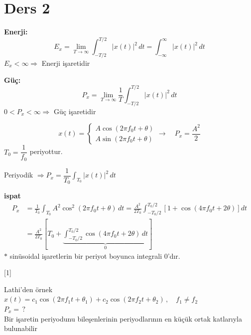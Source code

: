 \documentclass[11pt,a4paper]{article}
\begin{document}

\section{Ders 2}
\textbf{Enerji:}
\[ E_x = \lim_{T\to\infty}\int_{-T/2}^{T/2}|x(t)|^2\,dt = \int_{-\infty}^{\infty}|x(t)|^2\,dt \]
$E_x<\infty \Rightarrow$ Enerji işaretidir

\textbf{Güç:}
\[ P_x = \lim_{T\to\infty}\frac{1}{T}\int_{-T/2}^{T/2}|x(t)|^2\,dt \]
$0<P_x<\infty \Rightarrow$ Güç işaretidir

\[ x(t)=\begin{cases} A\cos(2\pi f_0 t+\theta)\\ A\sin(2\pi f_0 t+\theta)\end{cases} \longrightarrow\quad P_x=\frac{A^2}{2} \]
$T_0=\dfrac{1}{f_0}$ periyottur.

Periyodik $\Rightarrow P_x=\dfrac{1}{T_0}\displaystyle\int_{T_0}|x(t)|^2\,dt$

\textcolor{kirmizikalem}{\textbf{ispat}}
\begin{align*}
P_x &= \frac{1}{T_0}\int_{T_0}A^2\cos^2(2\pi f_0 t+\theta)\,dt = \frac{A^2}{2T_0}\int_{-T_0/2}^{T_0/2}\left[1+\cos(4\pi f_0 t+2\theta)\right]dt \\
&= \frac{A^2}{2T_0}\left[T_0+\underbrace{\int_{-T_0/2}^{T_0/2}\cos(4\pi f_0 t+2\theta)\,dt}_{0}\right]
\end{align*}
$\ast$ sinüsoidal işaretlerin bir periyot boyunca integrali 0'dır.

[1]

\begin{ornek}
  Lathi'den örnek \\
  $x(t)=c_1\cos(2\pi f_1 t+\theta_1)+c_2\cos(2\pi f_2 t+\theta_2)\,,\quad f_1\neq f_2$ \\
  $P_x=\,?$ \\
  Bir işaretin periyodunu bileşenlerinin periyodlarının en küçük ortak katlarıyla bulunabilir
\end{ornek}
\end{document}
